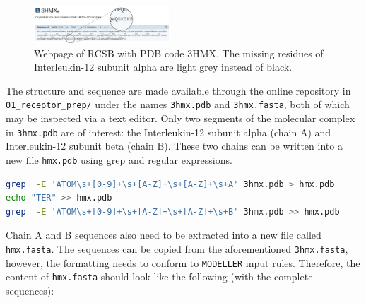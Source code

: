 \documentclass[9pt,tutorial]{livecoms}
\newcommand{\code}[1]{\colorbox{light-gray}{\texttt{#1}}}
\begin{document}
\begin{figure}[H]
    \centering
    \includegraphics[width=0.45\textwidth]{figures/3hmx.png}
    \caption{Webpage of RCSB with PDB code 3HMX. The missing residues of Interleukin-12 subunit alpha are light grey instead of black.}
    \label{fig:3HMX}
\end{figure}

The structure and sequence are made available through the online repository in \code{01\_receptor\_prep/} under the names \code{3hmx.pdb} and \code{3hmx.fasta}, both of which may be inspected via a text editor. Only two segments of the molecular complex in \code{3hmx.pdb} are of interest: the Interleukin-12 subunit alpha (chain A) and Interleukin-12 subunit beta (chain B). These two chains can be written into a new file \code{hmx.pdb} using grep and regular expressions.

\begin{lstlisting}[language=bash]
grep  -E 'ATOM\s+[0-9]+\s+[A-Z]+\s+[A-Z]+\s+A' 3hmx.pdb > hmx.pdb
echo "TER" >> hmx.pdb
grep  -E 'ATOM\s+[0-9]+\s+[A-Z]+\s+[A-Z]+\s+B' 3hmx.pdb >> hmx.pdb
\end{lstlisting}

Chain A and B sequences also need to be extracted into a new file called \code{hmx.fasta}. The sequences can be copied from the aforementioned \code{3hmx.fasta}, however, the formatting needs to conform to \texttt{MODELLER} input rules. Therefore, the content of \code{hmx.fasta} should look like the following (with the complete sequences):
\end{document}
